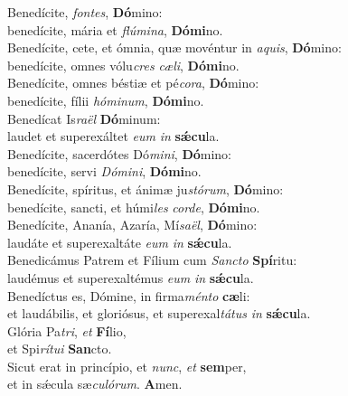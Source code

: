 \evenverse Benedícite, \textit{fon}\textit{tes}, \textbf{Dó}mino:~\*\\
\evenverse benedícite, mária et \textit{flú}\textit{mi}\textit{na}, \textbf{Dó}\textbf{mi}no.\\
\oddverse Benedícite, cete, et ómnia, quæ movéntur in \textit{a}\textit{quis}, \textbf{Dó}mino:~\*\\
\oddverse benedícite, omnes vólu\textit{cres} \textit{cæ}\textit{li}, \textbf{Dó}\textbf{mi}no.\\
\evenverse Benedícite, omnes béstiæ et pé\textit{co}\textit{ra}, \textbf{Dó}mino:~\*\\
\evenverse benedícite, fílii \textit{hó}\textit{mi}\textit{num}, \textbf{Dó}\textbf{mi}no.\\
\oddverse Benedícat Is\textit{ra}\textit{ël} \textbf{Dó}minum:~\*\\
\oddverse laudet et superexáltet \textit{e}\textit{um} \textit{in} \textbf{sǽ}\textbf{cu}la.\\
\evenverse Benedícite, sacerdótes Dó\textit{mi}\textit{ni}, \textbf{Dó}mino:~\*\\
\evenverse benedícite, servi \textit{Dó}\textit{mi}\textit{ni}, \textbf{Dó}\textbf{mi}no.\\
\oddverse Benedícite, spíritus, et ánimæ ju\textit{stó}\textit{rum}, \textbf{Dó}mino:~\*\\
\oddverse benedícite, sancti, et húmi\textit{les} \textit{cor}\textit{de}, \textbf{Dó}\textbf{mi}no.\\
\evenverse Benedícite, Ananía, Azaría, Mí\textit{sa}\textit{ël}, \textbf{Dó}mino:~\*\\
\evenverse laudáte et superexaltáte \textit{e}\textit{um} \textit{in} \textbf{sǽ}\textbf{cu}la.\\
\oddverse Benedicámus Patrem et Fílium cum \textit{San}\textit{cto} \textbf{Spí}ritu:~\*\\
\oddverse laudémus et superexaltémus \textit{e}\textit{um} \textit{in} \textbf{sǽ}\textbf{cu}la.\\
\evenverse Benedíctus es, Dómine, in firma\textit{mén}\textit{to} \textbf{cæ}li:~\*\\
\evenverse et laudábilis, et gloriósus, et superexal\textit{tá}\textit{tus} \textit{in} \textbf{sǽ}\textbf{cu}la.\\
\oddverse Glória Pa\textit{tri}, \textit{et} \textbf{Fí}lio,~\*\\
\oddverse et Spi\textit{rí}\textit{tu}\textit{i} \textbf{San}cto.\\
\evenverse Sicut erat in princípio, et \textit{nunc}, \textit{et} \textbf{sem}per,~\*\\
\evenverse et in sǽcula sæ\textit{cu}\textit{ló}\textit{rum}. \textbf{A}men.\\
